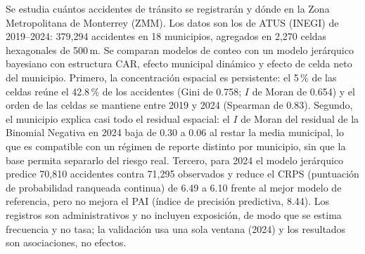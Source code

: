Se estudia cuántos accidentes de tránsito se registrarán y dónde en la Zona
Metropolitana de Monterrey (ZMM). Los datos son los de ATUS (INEGI) de
2019--2024: 379,294 accidentes en 18 municipios, agregados en 2,270 celdas
hexagonales de 500\,m. Se comparan modelos de conteo con un modelo jerárquico
bayesiano con estructura CAR, efecto municipal dinámico y efecto de celda neto
del municipio. Primero, la concentración espacial es persistente: el 5\,\% de
las celdas reúne el 42.8\,\% de los accidentes (Gini de 0.758; $I$ de Moran de
0.654) y el orden de las celdas se mantiene entre 2019 y 2024 (Spearman de
0.83). Segundo, el municipio explica casi todo el residual espacial: el $I$ de Moran
del residual de la Binomial Negativa en 2024 baja de 0.30 a 0.06 al restar la
media municipal, lo
que es compatible con un régimen de reporte distinto por municipio, sin que la
base permita separarlo del riesgo real. Tercero, para 2024 el modelo jerárquico predice
70,810 accidentes contra 71,295 observados y reduce el CRPS (puntuación de
probabilidad ranqueada continua) de 6.49 a 6.10 frente al mejor modelo de
referencia, pero no mejora el PAI (índice de precisión predictiva, 8.44). Los
registros son administrativos y no incluyen exposición, de modo que se estima
frecuencia y no tasa; la validación usa una sola ventana (2024) y los
resultados son asociaciones, no efectos.
